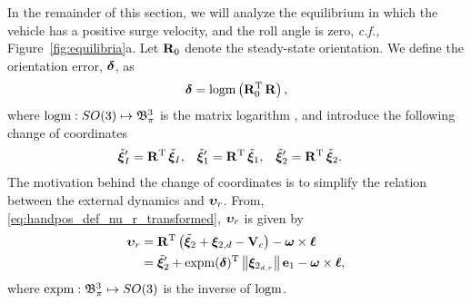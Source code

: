 In the remainder of this section, we will analyze the equilibrium in which the vehicle has a positive surge velocity, and the roll angle is zero, \emph{c.f.,} Figure~\ref{fig:equilibria}a.
Let $\mat{R}_0$ denote the steady-state orientation.
We define the orientation error, $\bs{\delta}$, as
\begin{equation}
    \bs{\delta} = {\rm logm}\left(\mat{R}_0\T\,\mat{R}\right),
    \label{eq:handpos_trajectory_delta}
\end{equation}
where ${\rm logm}: SO(3) \mapsto \ball[3]{\pi}$ is the matrix logarithm \cite{iserles_lie_2000}, and introduce the following change of coordinates
\begin{align}
    \tilde{\bs{\xi}}_I^{\prime} &= \mathbf{R}\T\,\tilde{\bs{\xi}}_I, &
    \tilde{\bs{\xi}}_1^{\prime} &= \mathbf{R}\T\,\tilde{\bs{\xi}}_1, &
    \tilde{\bs{\xi}}_2^{\prime} &= \mathbf{R}\T\,\tilde{\bs{\xi}}_2.
\end{align}
The motivation behind the change of coordinates is to simplify the relation between the external dynamics and $\bvel_r$.
From, \eqref{eq:handpos_def_nu_r_transformed}, $\bvel_r$ is given by
\begin{equation}
    \begin{split}
    \bvel_r &= \mathbf{R}\T\left(\tilde{\bs{\xi}}_2 + \bs{\xi}_{2, d} - \ocean\right) - \bs{\omega} \times \handl \\
        &= \tilde{\bs{\xi}}_2^{\prime} + {\rm expm}(\bs{\delta})\T \norm{\bs{\xi}_{2_{d,r}}}\mat{e}_1 - \bs{\omega} \times \handl,
    \end{split}
\end{equation}
where ${\rm expm}: \ball[3]{\pi} \mapsto SO(3)$ is the inverse of ${\rm logm}$.

